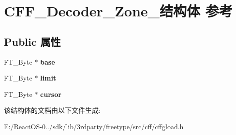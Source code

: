 \hypertarget{struct_c_f_f___decoder___zone__}{}\section{C\+F\+F\+\_\+\+Decoder\+\_\+\+Zone\+\_\+结构体 参考}
\label{struct_c_f_f___decoder___zone__}
\subsection*{Public 属性}
\begin{DoxyCompactItemize}
\item 
\mbox{\label{struct_c_f_f___decoder___zone___adffd8270fea17f125a1615d7a6cc09c2}} 
F\+T\+\_\+\+Byte $\ast$ {\bfseries base}
\item 
\mbox{\label{struct_c_f_f___decoder___zone___ad3e3efa2e2b7dd69292757fbf7e63e53}} 
F\+T\+\_\+\+Byte $\ast$ {\bfseries limit}
\item 
\mbox{\label{struct_c_f_f___decoder___zone___a5ac12c9c151964cee76b5b11e5c22453}} 
F\+T\+\_\+\+Byte $\ast$ {\bfseries cursor}
\end{DoxyCompactItemize}


该结构体的文档由以下文件生成\+:\begin{DoxyCompactItemize}
\item 
E\+:/\+React\+O\+S-\/0../sdk/lib/3rdparty/freetype/src/cff/cffgload.\+h\end{DoxyCompactItemize}
